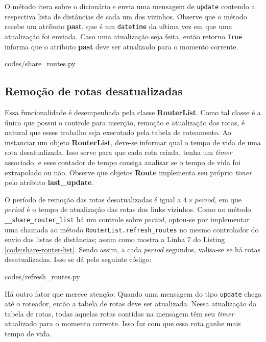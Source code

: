 O método itera sobre o dicionário e envia uma mensagem de \texttt{update}
contendo a respectiva lista de distâncias de cada um dos vizinhos.
Observe que o método recebe um atributo \textbf{past}, que é um
\texttt{datetime} da ultima vez em que uma atualização foi enviada.
Caso uma atualização seja feita, então retorno \texttt{True} informa que o
atributo \textbf{past} deve ser atualizado para o momento corrente.


{codes/share_routes.py}

\subsection{Remoção de rotas desatualizadas}
Essa funcionalidade é desempenhada pela classe \textbf{RouterList}.
Como tal classe é a única que possui o controle para inserção, remoção e
atualização das rotas, é natural que esses trabalho seja executado pela tabela
de roteamento.
Ao instanciar um objeto \textbf{RouterList}, deve-se informar qual o tempo de
vida de uma rota desatualizada.
Isso serve para que cada rota criada, tenha um \textit{timer} associado, e esse
contador de tempo consiga analisar se o tempo de vida foi extrapolado ou não.
Observe que objetos \textbf{Route} implementa seu próprio \textit{timer} pelo
atributo \textbf{last\_update}.

O período de remoção das rotas desatualizadas é igual a $4 \times period$, em
que $period$ é o tempo de atualização das rotas dos links vizinhos.
Como no método \texttt{\_\_share\_router\_list} há um controle sobre $period$,
optou-se por implementar uma chamada ao método \texttt{RouterList.refresh\_routes}
no mesmo controlador do envio das listas de distâncias; assim como mostra a
Linha 7 do Listing \ref{code:share-router-list}.
Sendo assim, a cada $period$ segundos, valisa-se se há rotas desatualizadas.
Isso se dá pelo seguinte código:

{codes/refresh_routes.py}

Há outro fator que merece atenção: Quando uma mensagem do tipo \texttt{update}
chega até o roteador, então a tabela de rotas deve ser atualizada.
Nessa atualização da tabela de rotas, todas aquelas rotas contidas na mensagem
têm seu \textit{timer} atualizado para o momento corrente.
Isso faz com que essa rota ganhe mais tempo de vida.

